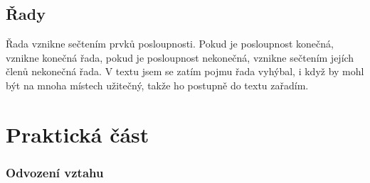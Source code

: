 \documentclass[12pt]{report}			%
\begin{document}
\chapter{Řady}
Řada vznikne sečtením prvků posloupnosti. Pokud je posloupnost konečná, vznikne konečná řada, pokud je posloupnost nekonečná, vznikne sečtením jejích členů nekonečná řada. V textu jsem se zatím pojmu řada vyhýbal, i když by mohl být na mnoha místech užitečný, takže ho postupně do textu zařadím.
	\part{Praktická část}
\section*{Odvození vztahu}
\end{document}

